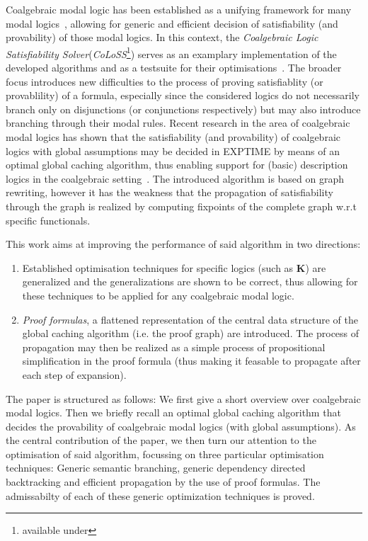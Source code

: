 \documentclass{llncs}
\begin{document}
Coalgebraic modal logic has been established as a unifying framework
for many modal logics~\cite{SchroderPattinson09}, allowing for generic and
efficient decision of satisfiability (and provability) of those modal logics.
In this context, the \emph{Coalgebraic Logic Satisfiability Solver}(\emph{CoLoSS}\footnote{available under  })
serves as an examplary implementation of the developed algorithms and as a testsuite
for their optimisations~\cite{CalinEA09,HausmannSchroder10}.
The broader focus introduces new difficulties to the process of proving
satisfiablity (or provablility) of a formula, especially since the considered
logics do not necessarily branch only on disjunctions (or conjunctions respectively) but
may also introduce branching through their modal rules.
Recent research in the area of coalgebraic modal logics has shown that the
satisfiability (and provability) of coalgebraic logics with global assumptions
may be decided in EXPTIME by means of an optimal global caching algorithm, thus
enabling support for (basic) description logics in the coalgebraic setting~\cite{GoreEA10}.
The introduced algorithm is based on graph rewriting, however it has the weakness
that the propagation of satisfiability through the graph is realized by
computing fixpoints of the complete graph w.r.t specific functionals.

This work aims at improving the performance of said algorithm in two directions:

\begin{enumerate}
\item Established optimisation techniques for specific logics (such as \textbf{K}) are
generalized and the generalizations are shown to be correct, thus allowing for these techniques
to be applied for any coalgebraic modal logic.
\item \emph{Proof formulas}, a flattened representation of the central data structure of the global caching algorithm
(i.e. the proof graph) are introduced. The process of propagation may then be realized as a simple process of
propositional simplification in the proof formula (thus making it feasable to propagate after each step of expansion).
\end{enumerate}

The paper is structured as follows: We first give a short overview over 
coalgebraic modal logics. Then we briefly recall an optimal global caching
algorithm that decides the provability of coalgebraic modal logics (with global
assumptions). As the central contribution of the paper, we then turn our attention
to the optimisation of said algorithm, focussing on three particular optimisation
techniques: Generic semantic branching, generic dependency directed backtracking
and efficient propagation by the use of proof formulas. The admissabilty of each
of these generic optimization techniques is proved.
\end{document}
